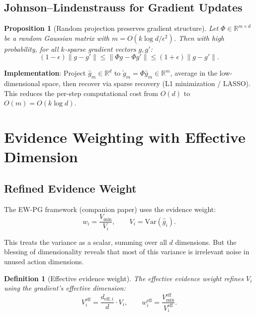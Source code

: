 \documentclass[11pt,a4paper]{article}
\newtheorem{proposition}[theorem]{Proposition}
\newtheorem{definition}[theorem]{Definition}
\newcommand{\R}{\mathbb{R}}
\newcommand{\norm}[1]{\|#1\|}
\begin{document}
\subsection{Johnson--Lindenstrauss for Gradient Updates}

\begin{proposition}[Random projection preserves gradient structure]\label{prop:jl}
Let $\Phi \in \R^{m \times d}$ be a random Gaussian matrix with
$m = O(k \log d / \epsilon^2)$. Then with high probability, for all
$k$-sparse gradient vectors $g, g'$:
\begin{equation}
  (1 - \epsilon)\norm{g - g'} \leq \norm{\Phi g - \Phi g'} \leq (1 + \epsilon)\norm{g - g'}.
\end{equation}
\end{proposition}

\textbf{Implementation}: Project $\hat{g}_m \in \R^d$ to
$\tilde{g}_m = \Phi \hat{g}_m \in \R^m$, average in the low-dimensional
space, then recover via sparse recovery (L1 minimization / LASSO).
This reduces the per-step computational cost from $O(d)$ to $O(m) = O(k \log d)$.


\section{Evidence Weighting with Effective Dimension}

\subsection{Refined Evidence Weight}

The EW-PG framework (companion paper) uses the evidence weight:
\begin{equation}
  w_i = \frac{V_{\min}}{V_i}, \qquad V_i = \text{Var}(\hat{g}_i).
\end{equation}

This treats the variance as a scalar, summing over all $d$ dimensions.
But the blessing of dimensionality reveals that most of this variance
is irrelevant noise in unused action dimensions.

\begin{definition}[Effective evidence weight]\label{def:eff-evidence}
The effective evidence weight refines $V_i$ using the gradient's
effective dimension:
\begin{equation}\label{eq:eff-weight}
  V_i^{\text{eff}} = \frac{d_{\text{eff},i}}{d} \cdot V_i,
  \qquad
  w_i^{\text{eff}} = \frac{V_{\min}^{\text{eff}}}{V_i^{\text{eff}}}.
\end{equation}
\end{definition}
\end{document}
